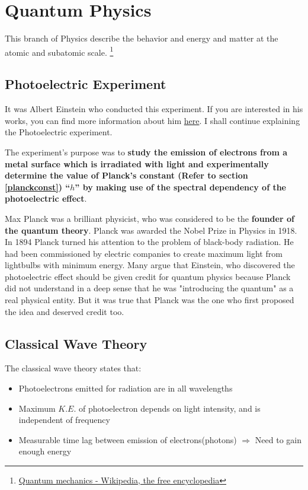 \section{Quantum Physics}
This branch of Physics describe the behavior and energy and matter at the atomic and subatomic scale. \footnote{\href{http://en.wikipedia.org/wiki/Introduction_to_quantum_mechanics}{Quantum mechanics - Wikipedia, the free encyclopedia}}

\subsection{Photoelectric Experiment}
\label{photoelectricexp}
It was Albert Einstein who conducted this experiment. If you are interested in his works, you can find more information about him \href{http://en.wikipedia.org/wiki/Albert_Einstein}{here}. I shall continue explaining the Photoelectric experiment.

The experiment's purpose was to \textbf{study the emission of electrons from a metal surface which is irradiated with light and experimentally determine the value of Planck's constant (Refer to section \ref{planckconst}) ``$h$'' by making use of the spectral dependency of the photoelectric effect}.

Max Planck was a brilliant physicist, who was considered to be the \textbf{founder of the quantum theory}. Planck was awarded the Nobel Prize in Physics in 1918. In 1894 Planck turned his attention to the problem of black-body radiation. He had been commissioned by electric companies to create maximum light from lightbulbs with minimum energy. Many argue that Einstein, who discovered the photoelectric effect should be given credit for quantum physics because Planck did not understand in a deep sense that he was "introducing the quantum" as a real physical entity. But it was true that Planck was the one who first proposed the idea and deserved credit too.

\subsection{Classical Wave Theory}
The classical wave theory states that:
\begin{itemize}
\item Photoelectrons emitted for radiation are in all wavelengths
\item Maximum $K.E.$ of photoelectron depends on light intensity, and is independent of frequency
\item Measurable time lag between emission of electrons(photons) $\Longrightarrow$ Need to gain enough energy
\end{itemize}

